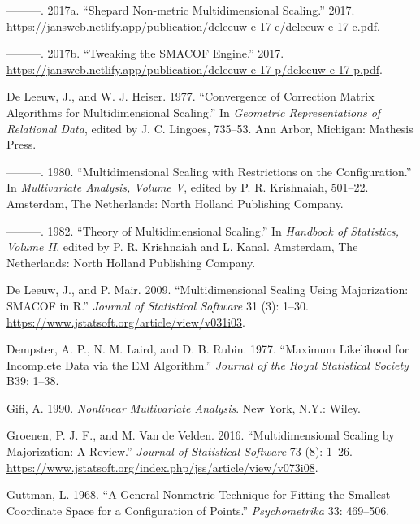 \documentclass[
  12pt,
  letterpaper,
  DIV=11,
  numbers=noendperiod]{scrartcl}
\newlength{\cslhangindent}
\newenvironment{CSLReferences}[2] %
 {\begin{list}{}{%
  \setlength{\itemindent}{0pt}
  \setlength{\leftmargin}{0pt}
  \setlength{\parsep}{0pt}
  \ifodd #1
   \setlength{\leftmargin}{\cslhangindent}
   \setlength{\itemindent}{-1\cslhangindent}
  \fi
  \setlength{\itemsep}{#2\baselineskip}}}
 {\end{list}}
\begin{document}
\begin{CSLReferences}{1}{0}
---------. 2017a. {``{Shepard Non-metric Multidimensional Scaling}.''}
2017.
\url{https://jansweb.netlify.app/publication/deleeuw-e-17-e/deleeuw-e-17-e.pdf}.

---------. 2017b. {``{Tweaking the SMACOF Engine}.''} 2017.
\url{https://jansweb.netlify.app/publication/deleeuw-e-17-p/deleeuw-e-17-p.pdf}.

De Leeuw, J., and W. J. Heiser. 1977. {``Convergence of Correction
Matrix Algorithms for Multidimensional Scaling.''} In \emph{Geometric
Representations of Relational Data}, edited by J. C. Lingoes, 735--53.
Ann Arbor, Michigan: Mathesis Press.

---------. 1980. {``Multidimensional Scaling with Restrictions on the
Configuration.''} In \emph{Multivariate Analysis, Volume {V}}, edited by
P. R. Krishnaiah, 501--22. Amsterdam, The Netherlands: North Holland
Publishing Company.

---------. 1982. {``Theory of Multidimensional Scaling.''} In
\emph{Handbook of Statistics, Volume {II}}, edited by P. R. Krishnaiah
and L. Kanal. Amsterdam, The Netherlands: North Holland Publishing
Company.

De Leeuw, J., and P. Mair. 2009. {``{Multidimensional Scaling Using
Majorization: SMACOF in R}.''} \emph{Journal of Statistical Software} 31
(3): 1--30. \url{https://www.jstatsoft.org/article/view/v031i03}.

Dempster, A. P., N. M. Laird, and D. B. Rubin. 1977. {``{Maximum
Likelihood for Incomplete Data via the EM Algorithm}.''} \emph{Journal
of the Royal Statistical Society} B39: 1--38.

Gifi, A. 1990. \emph{Nonlinear Multivariate Analysis}. New York, N.Y.:
Wiley.

Groenen, P. J. F., and M. Van de Velden. 2016. {``{Multidimensional
Scaling by Majorization: A Review}.''} \emph{Journal of Statistical
Software} 73 (8): 1--26.
\url{https://www.jstatsoft.org/index.php/jss/article/view/v073i08}.

Guttman, L. 1968. {``{A General Nonmetric Technique for Fitting the
Smallest Coordinate Space for a Configuration of Points}.''}
\emph{Psychometrika} 33: 469--506.


\end{CSLReferences}
\end{document}
